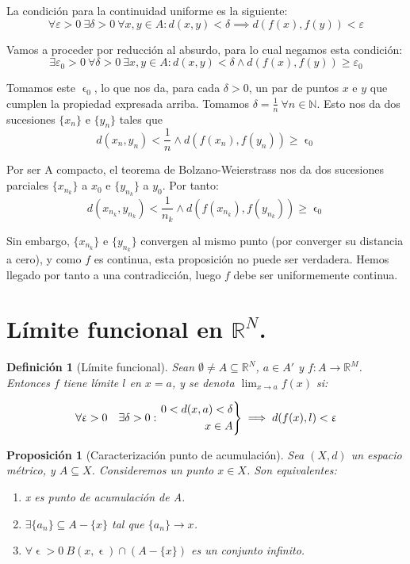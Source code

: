 \documentclass[11pt, a4paper, titlepage]{article}
\makeatletter
\let\epsilon\upvarepsilon
\renewenvironment{proof}[1][\proofname] {\vspace{-15pt}\par\pushQED{\qed}\normalfont\topsep6\p@\@plus6\p@\relax\trivlist\item[\hskip\labelsep\it#1\@addpunct{.}]\ignorespaces}{\popQED\endtrivlist\@endpefalse}
\theoremstyle{theorem-style}
\newtheorem*{nprop}{Proposición}
\theoremstyle{definition-style}
\newtheorem*{ndef}{Definición}
\theoremstyle{remark-style}
\theoremstyle{example-style}
\newenvironment{nlist}
{\begin{enumerate}
\renewcommand\labelenumi{(\emph{\roman{enumi})}}}
{\end{enumerate}}
\newenvironment{rcases}
  {\left.\begin{aligned}}
  {\end{aligned}\right\rbrace}
\makeatother
\begin{document}
\begin{proof}[Demostración alternativa]
	La condición para la continuidad uniforme es la siguiente:
	\[
		\forall \varepsilon > 0 \  \exists \delta > 0 \ \forall x, y \in A : d(x,y) < \delta \implies d (f(x) , f(y) ) < \varepsilon
	\]
	
	Vamos a proceder por reducción al absurdo, para lo cual negamos esta condición:
	\[
		\exists \varepsilon_0 > 0 \ \forall \delta > 0 \ \exists x, y \in A : d (x,y) < \delta \wedge d (f(x) , f(y) ) \ge \varepsilon_0
	\]
	
	Tomamos este $\epsilon_0$, lo que nos da, para cada $\delta>0$, un par de puntos $x$ e $y$ que cumplen la propiedad expresada arriba. Tomamos $\delta = \frac{1}{n} \ \forall n\in \mathbb{N}$. Esto nos da dos sucesiones $\{x_n\}$ e $\{y_n\}$ tales que
	\[
		d(x_n,y_n) < \frac{1}{n} \wedge d(f(x_n),f(y_n)) \ge \epsilon_0
	\]
	
	Por ser A compacto, el teorema de Bolzano-Weierstrass nos da dos sucesiones parciales $\{x_{n_k}\}$ a $x_0$ e $\{y_{n_k}\}$ a $y_0$. Por tanto:
	\[
		d(x_{n_k},y_{n_k}) < \frac{1}{n_k} \wedge d(f(x_{n_k}),f(y_{n_k})) \ge \epsilon_0
	\]
	
	Sin embargo, $\{x_{n_k}\}$ e $\{y_{n_k}\}$ convergen al mismo punto (por converger su distancia a cero), y como $f$ es continua, esta proposición no puede ser verdadera. Hemos llegado por tanto a una contradicción, luego $f$ debe ser uniformemente continua.
\end{proof}


\section{Límite funcional en $\mathbb{R}^N$.}

\begin{ndef}[Límite funcional]
	Sean $\emptyset \ne A \subseteq \mathbb{R}^N$, $a\in A'$ y $f: A \longrightarrow \mathbb{R}^M$. Entonces $f$ tiene límite $l$ en $x=a$, y se denota $\displaystyle\lim_{x\to a} f(x)$ si:
	
\[
	\forall \epsilon>0\quad \exists \delta>0 : \begin{rcases}
	0<d(x,a)<\delta\\
	x\in A
\end{rcases} \implies d(f(x), l) < \epsilon
\]
\end{ndef}



\begin{nprop}[Caracterización punto de acumulación]
Sea $(X,d)$ un espacio métrico, y $A\subseteq X$. Consideremos un punto $x\in X$. Son equivalentes:

\begin{nlist}
\item x es punto de acumulación de A.
\item $\exists \{a_n\}\subseteq A-\{x\}$ tal que $\{a_n\} \rightarrow x$.
\item $\forall \epsilon > 0\ B(x,\epsilon)\cap (A-\{x\})$ es un conjunto infinito. 
\end{nlist}
\end{nprop}
\end{document}
